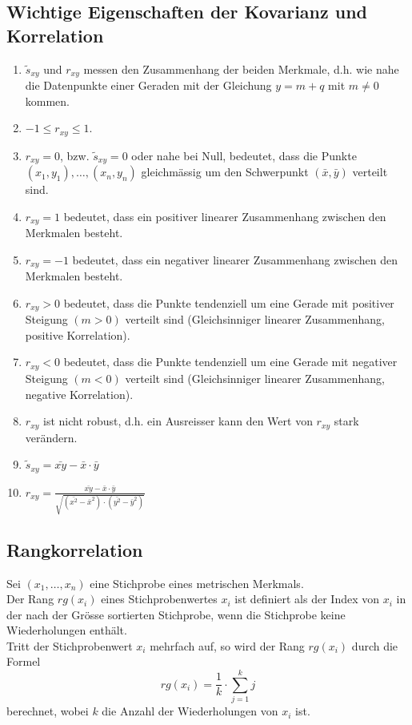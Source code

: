 \subsection{Wichtige Eigenschaften der Kovarianz und Korrelation}
\label{sec:desk_statistik_kovarianz_korrelation}
\begin{enumerate}
    \item $\tilde{s}_{xy}$ und $r_{xy}$ messen den Zusammenhang der beiden Merkmale, 
        d.h. wie nahe die  Datenpunkte einer Geraden mit der Gleichung $y = m + q$ mit $m \neq 0$ kommen.
    \item $-1 \leq r_{xy} \leq 1$.
    \item $r_{xy} = 0$, bzw. $\tilde{s}_{xy} = 0$ oder nahe bei Null, bedeutet, 
        dass die Punkte $(x_1, y_1), \dots, (x_n,y_n)$ gleichmässig um den Schwerpunkt 
        $(\bar{x}, \bar{y})$ verteilt sind.
    \item $r_{xy} = 1$ bedeutet, dass ein positiver linearer Zusammenhang zwischen den Merkmalen besteht.
    \item $r_{xy} = -1$ bedeutet, dass ein negativer linearer Zusammenhang zwischen den Merkmalen besteht.
    \item $r_{xy} > 0$ bedeutet, dass die Punkte tendenziell um eine Gerade mit positiver Steigung 
        $(m > 0)$ verteilt sind (Gleichsinniger linearer Zusammenhang, positive Korrelation).
    \item $r_{xy} < 0$ bedeutet, dass die Punkte tendenziell um eine Gerade mit negativer Steigung
        $(m < 0)$ verteilt sind (Gleichsinniger linearer Zusammenhang, negative Korrelation).
    \item $r_{xy}$ ist nicht robust, d.h. ein Ausreisser kann den Wert von $r_{xy}$ stark verändern.
    \item $\tilde{s}_{xy} = \bar{xy} - \bar{x} \cdot \bar{y}$
    \item $r_{xy} = \frac{\bar{xy} - \bar{x} \cdot \bar{y}}{\sqrt{(\bar{x^2} - \bar{x}^2) \cdot (\bar{y^2} - \bar{y}^2)}}$
\end{enumerate}

\subsection{Rangkorrelation}
\label{sec:desk_statistik_rangkorrelation}
Sei $(x_1, \dots, x_n)$ eine Stichprobe eines metrischen Merkmals. \\
Der Rang $rg(x_i)$ eines Stichprobenwertes $x_i$ ist definiert als der Index von $x_i$ 
in der nach der Grösse sortierten Stichprobe, wenn die Stichprobe keine Wiederholungen enthält. \\
Tritt der Stichprobenwert $x_i$ mehrfach auf, so wird der Rang $rg(x_i)$ durch die Formel
\begin{equation*}
    rg(x_i) = \frac{1}{k} \cdot \sum_{j=1}^k j
\end{equation*}
berechnet, wobei $k$ die Anzahl der Wiederholungen von $x_i$ ist. \\


